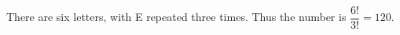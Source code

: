 There are six letters, with E repeated three times. Thus the number is $\dfrac{6!}{3!}=\boxed{120}$.
